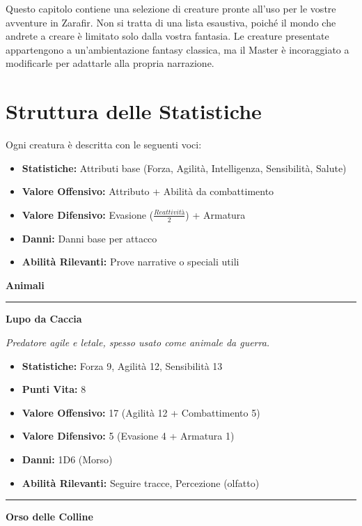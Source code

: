 \documentclass[../manuale_main.tex]{subfiles}
\begin{document}
Questo capitolo contiene una selezione di creature pronte all'uso per le vostre avventure in Zarafir. Non si tratta di una lista esaustiva, poiché il mondo che andrete a creare è limitato solo dalla vostra fantasia. Le creature presentate appartengono a un'ambientazione fantasy classica, ma il Master è incoraggiato a modificarle per adattarle alla propria narrazione.

\section{Struttura delle Statistiche}
Ogni creatura è descritta con le seguenti voci:
\begin{itemize}
\item \textbf{Statistiche:} Attributi base (Forza, Agilità, Intelligenza, Sensibilità, Salute)
\item \textbf{Valore Offensivo:} Attributo + Abilità da combattimento
\item \textbf{Valore Difensivo:} Evasione (\(\frac{\textit{Reattività}}{2}\)) + Armatura
\item \textbf{Danni:} Danni base per attacco
\item \textbf{Abilità Rilevanti:} Prove narrative o speciali utili
\end{itemize}

\vspace{0.5cm}
{\zarafirtitlefont\Large\bfseries\noindent Animali}

\vspace{0.2cm}
\noindent
\begin{center}
\rule{\textwidth}{0.4pt} 
\end{center}
\vspace{0.2cm}

{\zarafirtitlefont\Large\bfseries\noindent Lupo da Caccia}
\vspace{0.2cm}


\textit{Predatore agile e letale, spesso usato come animale da guerra.}
\begin{itemize}
\item \textbf{Statistiche:} Forza 9, Agilità 12, Sensibilità 13
\item \textbf{Punti Vita:} 8
\item \textbf{Valore Offensivo:} 17 (Agilità 12 + Combattimento 5)
\item \textbf{Valore Difensivo:} 5 (Evasione 4 + Armatura 1)
\item \textbf{Danni:} 1D6 (Morso)
\item \textbf{Abilità Rilevanti:} Seguire tracce, Percezione (olfatto)
\end{itemize}
\vspace{0.2cm}
\noindent
\begin{center}
\rule{\textwidth}{0.4pt} 
\end{center}
\vspace{0.2cm}
{\zarafirtitlefont\Large\bfseries\noindent Orso delle Colline}
\vspace{0.2cm}
\end{document}
